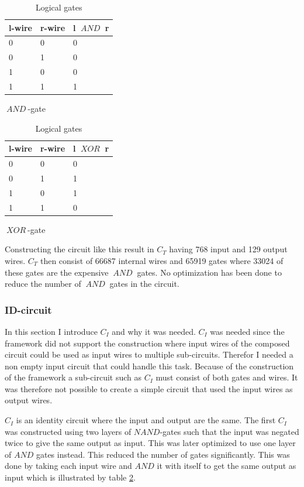 \documentclass[10pt,a4paper]{article}
\newcommand{\AND}{\ensuremath{~AND~}}
\newcommand{\XOR}{\ensuremath{~XOR~}}
\begin{document}
\begin{table}[h]
    \begin{subtable}{.5\linewidth}
    \centering
    \begin{tabular}{l l || l}
        l-wire & r-wire & l $\AND$ r    \\\hline
        0 & 0 & 0    \\
        0 & 1 & 0    \\
        1 & 0 & 0    \\
        1 & 1 & 1    
    \end{tabular}
    \caption{$\AND$-gate}
    \end{subtable}%
    \begin{subtable}{.5\linewidth}
    \centering
    \begin{tabular}{l l || l}
        l-wire & r-wire & l $\XOR$ r    \\\hline
        0 & 0 & 0    \\
        0 & 1 & 1    \\
        1 & 0 & 1    \\
        1 & 1 & 0    
    \end{tabular}
    \caption{$\XOR$-gate}
    \end{subtable} 
\caption{Logical gates }
\label{and xor gates}
\end{table}

Constructing the circuit like this result in $C_T$ having 768 input and 129 output
wires. $C_T$ then consist of 66687 internal wires and 65919 gates where 33024 of these gates are the expensive $\AND$ gates. No optimization has been done to reduce the number of $\AND$ gates in the circuit.

\subsubsection{ID-circuit}
In this section I introduce $C_I$ and why it was needed. $C_I$ was needed since the framework did not support the construction where input wires of the composed circuit could be used as input wires to multiple sub-circuits. Therefor I needed a non empty input circuit that could handle this task. Because of the construction of the framework a sub-circuit such as $C_I$ must consist of both gates and wires. It was therefore not possible to create a simple circuit that used the input wires as output wires.

\bigskip
$C_{I}$ is an identity circuit where the input and output are the same. The first $C_I$ was constructed using two layers of $NAND$-gates such that the input was negated twice to give the same output as input. This was later optimized to use one layer of $AND$ gates instead. This reduced the number of gates significantly. This was done by taking each input wire and $AND$ it with itself to get the same output as input which is illustrated by table \ref{and xor gates}.
\end{document}
